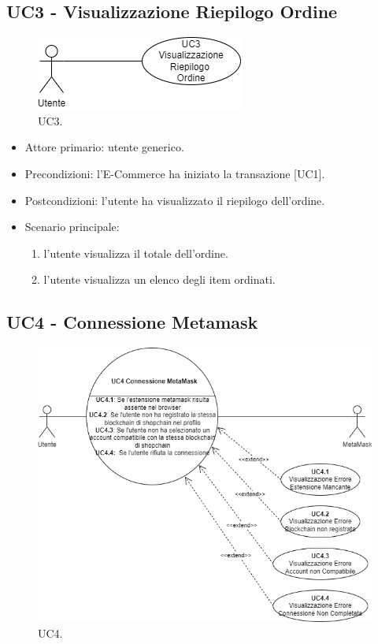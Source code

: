 \subsection{UC3 - Visualizzazione Riepilogo Ordine}

\begin{figure}[H]
    \centering
    \includegraphics[scale=0.7]{immagini/UseCases-UC3.png}
    \caption{UC3.}
  \end{figure}

\begin{itemize}
    \item Attore primario: utente generico.
    \item Precondizioni: l'E-Commerce ha iniziato la transazione [UC1].
    \item Postcondizioni: l'utente ha visualizzato il riepilogo dell'ordine.
    \item Scenario principale: \begin{enumerate}
        \item l'utente visualizza il totale dell'ordine.
        \item l'utente visualizza un elenco degli item ordinati.
    \end{enumerate}
\end{itemize}

\subsection{UC4 - Connessione Metamask}

\begin{figure}[H]
    \centering
    \includegraphics[scale=0.7]{immagini/UseCases-UC4.png}
    \caption{UC4.}
  \end{figure}

